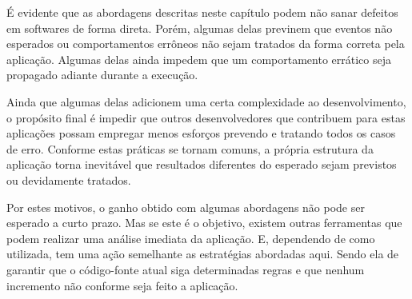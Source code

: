 É evidente que as abordagens descritas neste capítulo podem não sanar defeitos em softwares de forma direta. Porém, algumas delas previnem que eventos não esperados ou comportamentos errôneos não sejam tratados da forma correta pela aplicação. Algumas delas ainda impedem que um comportamento errático seja propagado adiante durante a execução.

Ainda que algumas delas adicionem uma certa complexidade ao desenvolvimento, o propósito final é impedir que outros desenvolvedores que contribuem para estas aplicações possam empregar menos esforços prevendo e tratando todos os casos de erro. Conforme estas práticas se tornam comuns, a própria estrutura da aplicação torna inevitável que resultados diferentes do esperado sejam previstos ou devidamente tratados.

Por estes motivos, o ganho obtido com algumas abordagens não pode ser esperado a curto prazo. Mas se este é o objetivo, existem outras ferramentas que podem realizar uma análise imediata da aplicação. E, dependendo de como utilizada, tem uma ação semelhante as estratégias abordadas aqui. Sendo ela de garantir que o código-fonte atual siga determinadas regras e que nenhum incremento não conforme seja feito a aplicação. 
